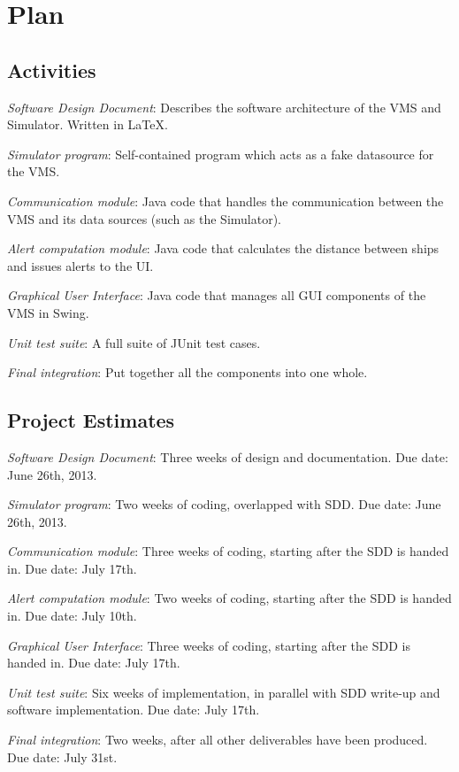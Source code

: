 \documentclass{article}
\begin{document}
\section{Plan} %

\subsection{Activities}

\emph{Software Design Document}: Describes the software architecture of the VMS and Simulator. Written in \LaTeX. 

\emph{Simulator program}: Self-contained program which acts as a fake datasource for the VMS.

\emph{Communication module}: Java code that handles the communication between the VMS and its data sources (such as the Simulator). 

\emph{Alert computation module}: Java code that calculates the distance between ships and issues alerts to the UI.

\emph{Graphical User Interface}: Java code that manages all GUI components of the VMS in Swing.

\emph{Unit test suite}: A full suite of JUnit test cases.

\emph{Final integration}: Put together all the components into one whole.

\subsection{Project Estimates}

\emph{Software Design Document}: Three weeks of design and documentation. Due date: June 26th, 2013.

\emph{Simulator program}: Two weeks of coding, overlapped with SDD. Due date: June 26th, 2013.

\emph{Communication module}: Three weeks of coding, starting after the SDD is handed in. Due date: July 17th.

\emph{Alert computation module}: Two weeks of coding, starting after the SDD is handed in. Due date: July 10th.

\emph{Graphical User Interface}: Three weeks of coding, starting after the SDD is handed in. Due date: July 17th.

\emph{Unit test suite}: Six weeks of implementation, in parallel with SDD write-up and software implementation. Due date: July 17th.

\emph{Final integration}: Two weeks, after all other deliverables have been produced. Due date: July 31st.
\end{document}
